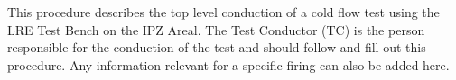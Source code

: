 This procedure describes the top level conduction of a cold flow test using the LRE Test Bench on the IPZ Areal. The Test Conductor (TC) is the person responsible for the conduction of the test and should follow and fill out this procedure.
Any information relevant for a specific firing can also be added here.
